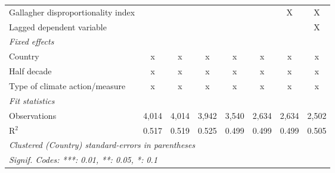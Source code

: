 \begin{tabular}{lccccccc}
   Gallagher disproportionality index                               &               &              &               &             &         & X       & X\\  
   Lagged dependent variable                                        &               &              &               &             &         &         & X\\  
   \emph{Fixed effects}\\
   Country                                                          & x             & x            & x             & x           & x       & x       & x\\  
   Half decade                                                      & x             & x            & x             & x           & x       & x       & x\\  
   Type of climate action/measure                                   & x             & x            & x             & x           & x       & x       & x\\  
   \midrule \emph{Fit statistics}\\
   Observations                                                     & 4,014         & 4,014        & 3,942         & 3,540       & 2,634   & 2,634   & 2,502\\  
   R$^2$                                                            & 0.517         & 0.519        & 0.525         & 0.499       & 0.499   & 0.499   & 0.505\\  
   \midrule
   \multicolumn{8}{l}{\emph{Clustered (Country) standard-errors in parentheses}}\\
   \multicolumn{8}{l}{\emph{Signif. Codes: ***: 0.01, **: 0.05, *: 0.1}}\\
\end{tabular}
\par\endgroup


